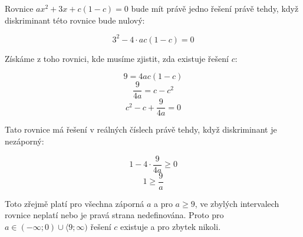 \documentclass{fkssolpub}
\author{Ondřej Sedláček}
\begin{document}
Rovnice $ax^2 + 3x + c (1 - c) = 0$ bude mít právě jedno řešení právě tehdy, když diskriminant této rovnice bude nulový:

\[
  3^2 - 4 \cdot a c (1 - c) = 0
\]

Získáme z toho rovnici, kde musíme zjistit, zda existuje řešení $c$:

\[
  9 = 4 a c (1 - c)
\]
\[
  \frac{9}{4a} = c - c^2
\]
\[
  c^2 - c + \frac{9}{4a} = 0
\]

Tato rovnice má řešení v reálných číslech právě tehdy, když diskriminant je nezáporný:

\[
  1 - 4 \cdot \frac{9}{4a} \geq 0
\]
\[
  1 \geq \frac{9}{a}
\]

Toto zřejmě platí pro všechna záporná $a$ a pro $a \geq 9$, ve zbylých intervalech rovnice neplatí nebo je pravá strana nedefinována. Proto pro $a \in (- \infty; 0) \cup \langle9; \infty)$ řešení $c$ existuje a pro zbytek nikoli.
\end{document}
